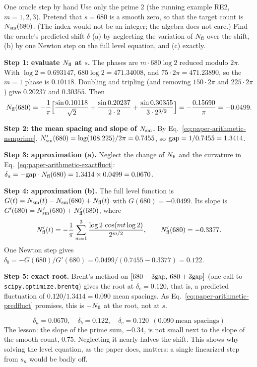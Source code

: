 \begin{sample}{One oracle step by hand}
Use only the prime $2$ (the running example RE2, $m=1,2,3$). Pretend that $s=680$ is a smooth zero, so that the target count is $N_{\mathrm{sm}}(680)$. (The index would not be an integer; the algebra does not care.) Find the oracle's predicted shift $\delta$ (a) by neglecting the variation of $N_{\mathrm{fl}}$ over the shift, (b) by one Newton step on the full level equation, and (c) exactly.

\textbf{Step 1: evaluate $N_{\mathrm{fl}}$ at $s$.} The phases are $m\cdot680\log2$ reduced modulo $2\pi$. With $\log2=0.693147$, $680\log 2 = 471.34008$, and $75\cdot2\pi=471.23890$, so the $m=1$ phase is $0.10118$. Doubling and tripling (and removing $150\cdot2\pi$ and $225\cdot2\pi$) give $0.20237$ and $0.30355$. Then
\[
N_{\mathrm{fl}}(680) = -\frac1\pi\Bigl[\frac{\sin 0.10118}{\sqrt2}+\frac{\sin0.20237}{2\cdot2}+\frac{\sin0.30355}{3\cdot2^{3/2}}\Bigr]
= -\frac{0.15690}{\pi} = -0.0499 .
\]

\textbf{Step 2: the mean spacing and slope of $N_{\mathrm{sm}}$.} By Eq.~\eqref{eq:paper-arithmetic-nsmprime}, $N_{\mathrm{sm}}'(680)=\log(108.225)/2\pi = 0.7455$, so $\mathrm{gap} = 1/0.7455 = 1.3414$.

\textbf{Step 3: approximation (a).} Neglect the change of $N_{\mathrm{fl}}$ and the curvature in Eq.~\eqref{eq:paper-arithmetic-exactfluct}: $\delta_a = -\mathrm{gap}\cdot N_{\mathrm{fl}}(680) = 1.3414\times0.0499 = 0.0670$.

\textbf{Step 4: approximation (b).} The full level function is $G(t)=N_{\mathrm{sm}}(t)-N_{\mathrm{sm}}(680)+N_{\mathrm{fl}}(t)$ with $G(680)=-0.0499$. Its slope is $G'(680)=N_{\mathrm{sm}}'(680)+N_{\mathrm{fl}}'(680)$, where
\[
N_{\mathrm{fl}}'(t) = -\frac{1}{\pi}\sum_{m=1}^3 \frac{\log 2\,\cos(m t\log2)}{2^{m/2}} ,
\qquad N_{\mathrm{fl}}'(680) = -0.3377 .
\]
One Newton step gives $\delta_b = -G(680)/G'(680) = 0.0499/(0.7455-0.3377) = 0.122$.

\textbf{Step 5: exact root.} Brent's method on $[680-3\mathrm{gap},\,680+3\mathrm{gap}]$ (one call to \texttt{scipy.optimize.brentq}) gives the root at $\delta_c = 0.120$, that is, a predicted fluctuation of $0.120/1.3414 = 0.090$ mean spacings. As Eq.~\eqref{eq:paper-arithmetic-predfluct} promises, this is $-N_{\mathrm{fl}}$ at the root, not at $s$.

\[
\boxed{\delta_a = 0.0670,\quad \delta_b = 0.122,\quad \delta_c = 0.120\ \ (0.090\ \text{mean spacings})}
\]
The lesson: the slope of the prime sum, $-0.34$, is not small next to the slope of the smooth count, $0.75$. Neglecting it nearly halves the shift. This shows why solving the level equation, as the paper does, matters: a single linearized step from $s_n$ would be badly off.
\end{sample}

